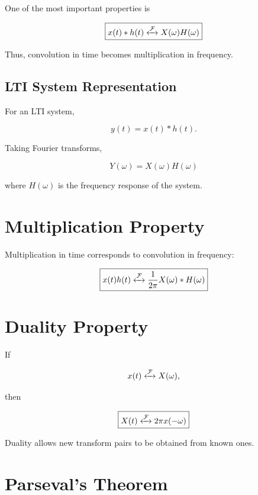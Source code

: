 One of the most important properties is

\[
\boxed{
x(t)*h(t)
\xleftrightarrow{\mathcal{F}}
X(\omega)H(\omega)
}
\]

Thus, convolution in time becomes multiplication in frequency.


\subsection{LTI System Representation}

For an LTI system,

\[
y(t)=x(t)*h(t).
\]

Taking Fourier transforms,

\[
\boxed{
Y(\omega)=X(\omega)H(\omega)
}
\]

where \(H(\omega)\) is the frequency response of the system.


\section{Multiplication Property}

Multiplication in time corresponds to convolution in frequency:

\[
\boxed{
x(t)h(t)
\xleftrightarrow{\mathcal{F}}
\frac{1}{2\pi}X(\omega)*H(\omega)
}
\]


\section{Duality Property}

If

\[
x(t)\xleftrightarrow{\mathcal{F}}X(\omega),
\]

then

\[
\boxed{
X(t)\xleftrightarrow{\mathcal{F}}2\pi x(-\omega)
}
\]

Duality allows new transform pairs to be obtained from known ones.


\section{Parseval’s Theorem}

